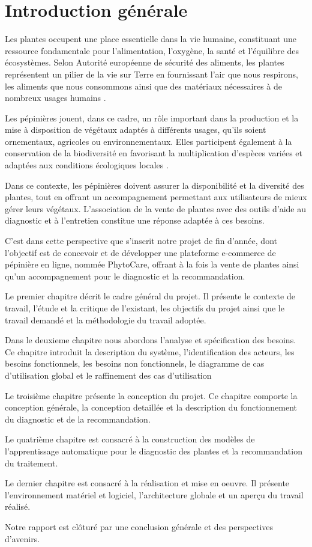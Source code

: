 \chapter*{Introduction générale}

Les plantes occupent une place essentielle dans la vie humaine, constituant une ressource fondamentale pour l’alimentation, l’oxygène, 
la santé et l’équilibre des écosystèmes. Selon Autorité européenne de sécurité des aliments, les plantes 
représentent un pilier de la vie sur Terre en fournissant l'air que nous respirons, les aliments que 
nous consommons ainsi que des matériaux nécessaires à de nombreux usages humains \cite{efsaref}.

Les pépinières jouent, dans ce cadre, un rôle important dans la production et la mise à disposition de 
végétaux adaptés à différents usages, qu'ils soient ornementaux, agricoles ou environnementaux. Elles 
participent également à la conservation de la biodiversité en favorisant la multiplication d'espèces 
variées et adaptées aux conditions écologiques locales \cite{natvilleref}.

Dans ce contexte, les pépinières doivent assurer la disponibilité et la diversité des plantes, 
tout en offrant un accompagnement permettant aux utilisateurs de mieux gérer leurs végétaux. 
L’association de la vente de plantes avec des outils d’aide au diagnostic et à l’entretien 
constitue une réponse adaptée à ces besoins.

C'est dans cette perspective que s'inscrit notre projet de fin d'année, dont l'objectif est de concevoir et de développer
une plateforme e-commerce de pépinière en ligne, nommée PhytoCare, offrant à la fois la vente de plantes ainsi qu'un accompagnement pour le 
diagnostic et la recommandation. 

Le premier chapitre décrit le cadre général du projet. Il présente le contexte de travail, l'étude et la 
critique de l'existant, les objectifs du projet ainsi que le travail demandé et la méthodologie du 
travail adoptée.

Dans le deuxieme chapitre nous abordons l'analyse et spécification des besoins. Ce chapitre introduit la 
description du système, l'identification des acteurs, les besoins fonctionnels, les besoins non 
fonctionnels, le diagramme de cas d'utilisation global et le raffinement des cas d'utilisation 

Le troisième chapitre présente la conception du projet. Ce chapitre comporte la conception générale, 
la conception detaillée et la description du fonctionnement du diagnostic et de la recommandation.

Le quatrième chapitre est consacré à la construction des modèles de l'apprentissage automatique pour le 
diagnostic des plantes et la recommandation du traitement.

Le dernier chapitre est consacré à la réalisation et mise en oeuvre. Il présente l'environnement matériel 
et logiciel, l'architecture globale et un aperçu du travail réalisé.

Notre rapport est clôturé par une conclusion générale et des perspectives d'avenirs.
